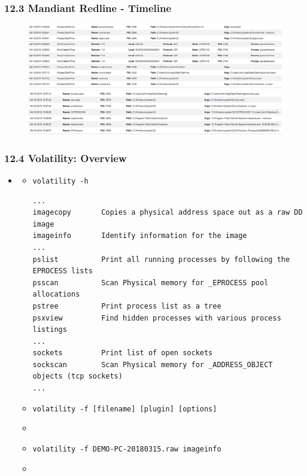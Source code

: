 \begin{frame}
  \frametitle{12.3 Mandiant Redline - Timeline}
  \begin{figure}
    \begin{center}
      \includegraphics[scale=0.37]{images/f12_redline-6.png}

      \vspace{0.2cm}

      \includegraphics[scale=0.4]{images/f12_redline-8.png}
    \end{center}
  \end{figure}
\end{frame}


\begin{frame}[fragile]
  \frametitle{12.4 Volatility: Overview}
    \begin{itemize}
        \item[]
            \begin{itemize}
                \item[] \texttt{volatility -h}
                \begin{lstlisting}[basicstyle=\tiny]
...
imagecopy      	Copies a physical address space out as a raw DD image
imageinfo      	Identify information for the image
...
pslist         	Print all running processes by following the EPROCESS lists 
psscan         	Scan Physical memory for _EPROCESS pool allocations
pstree         	Print process list as a tree
psxview        	Find hidden processes with various process listings
...
sockets        	Print list of open sockets
sockscan       	Scan Physical memory for _ADDRESS_OBJECT objects (tcp sockets)
...
                \end{lstlisting}
                \item[] \texttt{volatility -f [filename] [plugin] [options]}
                \item[]
                \item[] \texttt{volatility -f DEMO-PC-20180315.raw imageinfo}
                \item[]
            \end{itemize}
    \end{itemize}
\end{frame}


